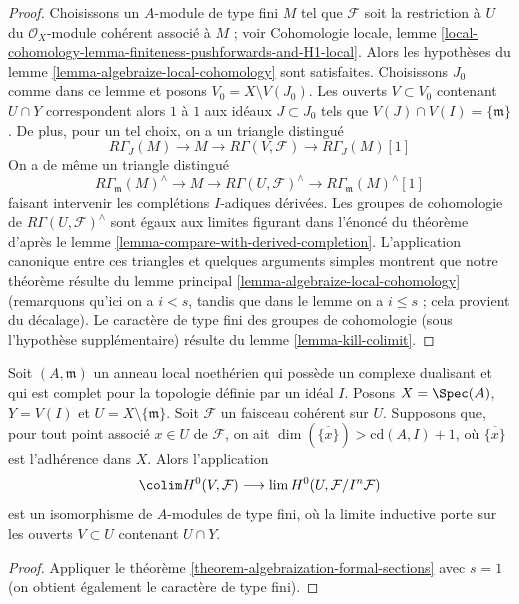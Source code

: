 \begin{proof}
Choisissons un $A$-module de type fini $M$ tel que $\mathcal{F}$ soit la
restriction à $U$ du
$\mathcal{O}_X$-module cohérent associé à $M$ ; voir Cohomologie locale,
lemme \ref{local-cohomology-lemma-finiteness-pushforwards-and-H1-local}.
Alors les hypothèses du
lemme \ref{lemma-algebraize-local-cohomology}
sont satisfaites.
Choisissons $J_0$ comme dans ce lemme et posons $V_0 = X \setminus V(J_0)$.
Les ouverts $V \subset V_0$ contenant $U \cap Y$
correspondent alors $1$ à $1$ aux idéaux $J \subset J_0$ tels que
$V(J) \cap V(I) = \{\mathfrak m\}$.
De plus, pour un tel choix, on a un triangle distingué
$$
R\Gamma_J(M) \to M \to R\Gamma(V, \mathcal{F}) \to
R\Gamma_J(M)[1]
$$
On a de même un triangle distingué
$$
R\Gamma_\mathfrak m(M)^\wedge \to
M \to
R\Gamma(U, \mathcal{F})^\wedge \to
R\Gamma_\mathfrak m(M)^\wedge[1]
$$
faisant intervenir les complétions $I$-adiques dérivées.
Les groupes de cohomologie de $R\Gamma(U, \mathcal{F})^\wedge$ sont
égaux aux limites figurant dans l'énoncé du théorème d'après le
lemme \ref{lemma-compare-with-derived-completion}.
L'application canonique entre ces triangles
et quelques arguments simples montrent que notre
théorème résulte du lemme principal \ref{lemma-algebraize-local-cohomology}
(remarquons qu'ici on a $i < s$, tandis que dans le lemme on a
$i \leq s$ ; cela provient du décalage).
Le caractère de type fini des groupes de cohomologie
(sous l'hypothèse supplémentaire) résulte du
lemme \ref{lemma-kill-colimit}.
\end{proof}

\begin{lemma}
\label{lemma-application-theorem}
Soit $(A, \mathfrak m)$ un anneau local noethérien qui possède un
complexe dualisant et qui est complet pour la topologie définie par un idéal $I$.
Posons $X = \Spec(A)$, $Y = V(I)$ et $U = X \setminus \{\mathfrak m\}$.
Soit $\mathcal{F}$ un faisceau cohérent sur $U$.
Supposons que, pour tout point associé $x \in U$ de $\mathcal{F}$,
on ait $\dim(\overline{\{x\}}) > \text{cd}(A, I) + 1$,
où $\overline{\{x\}}$ est l'adhérence dans $X$.
Alors l'application
$$
\colim H^0(V, \mathcal{F})
\longrightarrow
\lim H^0(U, \mathcal{F}/I^n\mathcal{F})
$$
est un isomorphisme de $A$-modules de type fini,
où la limite inductive porte sur les ouverts $V \subset U$
contenant $U \cap Y$.
\end{lemma}

\begin{proof}
Appliquer le théorème \ref{theorem-algebraization-formal-sections} avec $s = 1$
(on obtient également le caractère de type fini).
\end{proof}




